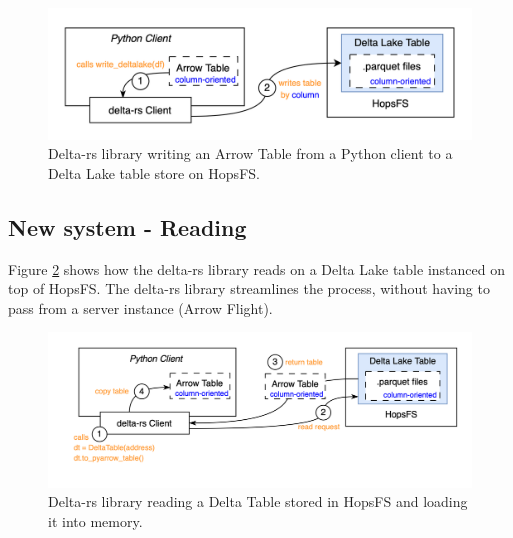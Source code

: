 \begin{figure}
    \begin{center}
      \includegraphics[width=\textwidth]{figures/2-background/delta-rs_writing.png}
    \end{center}
    \caption[Delta-rs library - Write process]{Delta-rs library writing an Arrow Table from a Python client to a Delta Lake table store on \gls{HopsFS}.}
    \label{fig:delta_rs_writing}
\end{figure}

\subsection{New system - Reading}

Figure \ref{fig:delta_rs_reading} shows how the delta-rs library reads on a Delta Lake table instanced on top of \gls{HopsFS}. The delta-rs library streamlines the process, without having to pass from a server instance (Arrow Flight).

\begin{figure}
    \begin{center}
      \includegraphics[width=\textwidth]{figures/2-background/delta-rs_reading.png}
    \end{center}
    \caption[Delta-rs library - Read process]{Delta-rs library reading a Delta Table stored in \gls{HopsFS} and loading it into memory.}
    \label{fig:delta_rs_reading}
\end{figure}